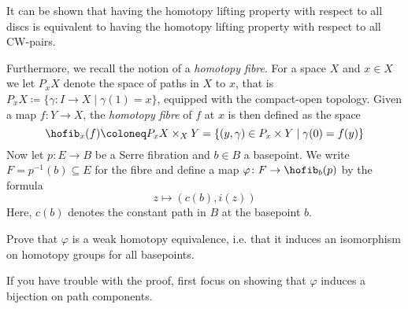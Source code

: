 \documentclass[wip, topology]{bsteffan-lecturenotes}
\begin{document}
\begin{exercise}
\begin{itemize}
			It can be shown that having the homotopy lifting property with respect to all discs is equivalent to having the homotopy lifting property with respect to all CW-pairs.
	\end{itemize}
	Furthermore, we recall the notion of a \emph{homotopy fibre}.
	For a space $X$ and $x \in X$ we let $P_x X$ denote the space of paths in $X$ to $x$, that is $P_x X \coloneq \{\gamma\colon I \to X \mid \gamma(1) = x\}$, equipped with the compact-open topology.
	Given a map $f\colon Y \to X$, the \emph{homotopy fibre} of $f$ at $x$ is then defined as the space
	\begin{equation*}
		\hofib_x(f) \coloneq P_x X \times_X Y = \{(y, \gamma) \in P_x \times Y \mid \gamma(0) = f(y)\}
	\end{equation*}
	Now let $p\colon E \to B$ be a Serre fibration and $b \in B$ a basepoint.
	We write $F = p^{-1}(b) \subseteq E$ for the fibre and define a map $\varphi\colon F \to \hofib_b(p)$ by the formula  
	\begin{equation*}
		z \mapsto (c(b), i(z))
	\end{equation*}
	Here, $c(b)$ denotes the constant path in $B$ at the basepoint $b$.

	Prove that $\varphi$ is a weak homotopy equivalence, i.e. that it induces an isomorphism on homotopy groups for all basepoints.
	\begin{hint}
		If you have trouble with the proof, first focus on showing that $\varphi$ induces a bijection on path components.
	\end{hint}
\end{exercise}
\end{document}
